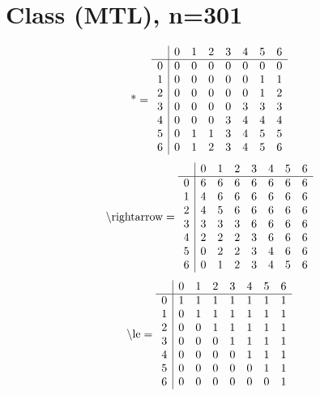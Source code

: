 \documentclass[11pt]{article}
\begin{document}
\section{Class (MTL), n=301}
\[\text{*} = 
\begin{array}{r | r r r r r r r}
 & 0 & 1 & 2 & 3 & 4 & 5 & 6 \\ \hline
0 & 0 & 0 & 0 & 0 & 0 & 0 & 0 \\
1 & 0 & 0 & 0 & 0 & 0 & 1 & 1 \\
2 & 0 & 0 & 0 & 0 & 0 & 1 & 2 \\
3 & 0 & 0 & 0 & 0 & 3 & 3 & 3 \\
4 & 0 & 0 & 0 & 3 & 4 & 4 & 4 \\
5 & 0 & 1 & 1 & 3 & 4 & 5 & 5 \\
6 & 0 & 1 & 2 & 3 & 4 & 5 & 6 \\
\end{array}
\]
\[\text{\textbackslash rightarrow} = 
\begin{array}{r | r r r r r r r}
 & 0 & 1 & 2 & 3 & 4 & 5 & 6 \\ \hline
0 & 6 & 6 & 6 & 6 & 6 & 6 & 6 \\
1 & 4 & 6 & 6 & 6 & 6 & 6 & 6 \\
2 & 4 & 5 & 6 & 6 & 6 & 6 & 6 \\
3 & 3 & 3 & 3 & 6 & 6 & 6 & 6 \\
4 & 2 & 2 & 2 & 3 & 6 & 6 & 6 \\
5 & 0 & 2 & 2 & 3 & 4 & 6 & 6 \\
6 & 0 & 1 & 2 & 3 & 4 & 5 & 6 \\
\end{array}
\]
\[\text{\textbackslash le} = 
\begin{array}{r | r r r r r r r}
 & 0 & 1 & 2 & 3 & 4 & 5 & 6 \\ \hline
0 & 1 & 1 & 1 & 1 & 1 & 1 & 1 \\
1 & 0 & 1 & 1 & 1 & 1 & 1 & 1 \\
2 & 0 & 0 & 1 & 1 & 1 & 1 & 1 \\
3 & 0 & 0 & 0 & 1 & 1 & 1 & 1 \\
4 & 0 & 0 & 0 & 0 & 1 & 1 & 1 \\
5 & 0 & 0 & 0 & 0 & 0 & 1 & 1 \\
6 & 0 & 0 & 0 & 0 & 0 & 0 & 1 \\
\end{array}
\]
\end{document}
